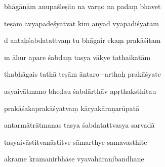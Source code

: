 \documentclass[article,12pt,a4paper]{memoir}%
\newcounter{parCount}
\begin{document}
	  
	  \pstart {} bhāgānām anupaśleṣān na varṇo na padaṃ bhavet 
	{}
	\pend%
      

	  
	  \pstart \leavevmode%
	teṣām avyapadeśyatvāt kim anyad vyapadiśyatām 
	{}
	\pend%
      

	  
	  \pstart {} d antaḥśabdatattvaṃ tu bhāgair ekaṃ prakāśitam 
	{}
	\pend%
      

	  
	  \pstart \leavevmode%
	m āhur apare śabdaṃ tasya vākye tathaikatām 
	{}
	\pend%
      

	  
	  \pstart {} thabhāgais tathā teṣām āntaro+arthaḥ prakāśyate 
	{}
	\pend%
      

	  
	  \pstart \leavevmode%
	asyaivātmano bhedau śabdārthāv apṛthaksthitau 
	{}
	\pend%
      

	  
	  \pstart {} prakāśakaprakāśyatvaṃ kāryakāraṇarūpatā 
	{}
	\pend%
      

	  
	  \pstart \leavevmode%
	antarmātrātmanas tasya śabdatattvasya sarvadā 
	{}
	\pend%
      

	  
	  \pstart {} tasyaivāstitvanāstitve sāmarthye samavasthite 
	{}
	\pend%
      

	  
	  \pstart \leavevmode%
	akrame kramanirbhāse vyavahāranibandhane 
	{}
	\pend%
      
\end{document}
